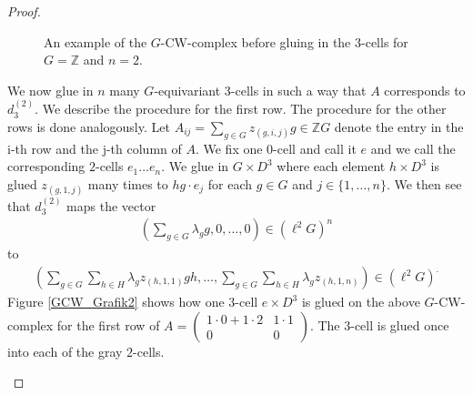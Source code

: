 \documentclass[12pt,a4paper]{scrartcl}
\theoremstyle{plain}
\theoremstyle{definition}
\newcommand{\Z}{\mathbb{Z}} %
\newcommand{\2}{\mathbb{Z} / 2 \mathbb{Z}}
\newcommand{\1}{\bar{1}}
\newcommand{\0}{\bar{0}}
\begin{document}
\begin{proof}
\begin{figure}[H]
		\caption{An example of the $G$-CW-complex before gluing in the $3$-cells for $G = \Z$ and $n=2$.}
		\label{GCW_Grafik}
	\end{figure}
	
	We now glue in $n$ many $G$-equivariant $3$-cells in such a way that $A$ corresponds to $d_3^{(2)}$. We describe the procedure for the first row. The procedure for the other rows is done analogously.
	Let $A_{ij} = \sum_{g \in G} z_{(g, i, j)} g \in \Z G$ denote the entry in the i-th row and the j-th column of $A$. We fix one $0$-cell and call it $e$ and we call the corresponding $2$-cells $e_1 \ldots e_n$. We glue in $G \times D^3$ where each element $h \times D^3$ is glued $z_{(g, 1, j)}$ many times to $h g \cdot e_j$ for each $g \in G$ and $j \in \{1, \ldots, n\}$. We then see that $d_3^{(2)}$ maps the vector 
	\begin{align*}
		(\sum_{g \in G} \lambda_g g, 0 , \ldots , 0) \in (\ell^2 G)^n
	\end{align*}
	to
	\begin{align*}
		(\sum_{g \in G} \sum_{h \in H} \lambda_g z_{(h, 1, 1)} g h, \ldots , \sum_{g \in G} \sum_{h \in H} \lambda_g z_{(h, 1, n)}) \in (\ell^2 G)^.
	\end{align*}
	Figure \ref{GCW_Grafik2} shows how one $3$-cell $e \times D^3$ is glued on the above $G$-CW-complex for the first row of $A= \begin{pmatrix}
		1 \cdot 0 + 1 \cdot 2 & 1 \cdot 1 \\
		0 & 0
		\end{pmatrix}$. The $3$-cell is glued once into each of the gray $2$-cells.
		\begin{figure}[H]
			\centering
\end{figure}
\end{proof}
\end{document}
